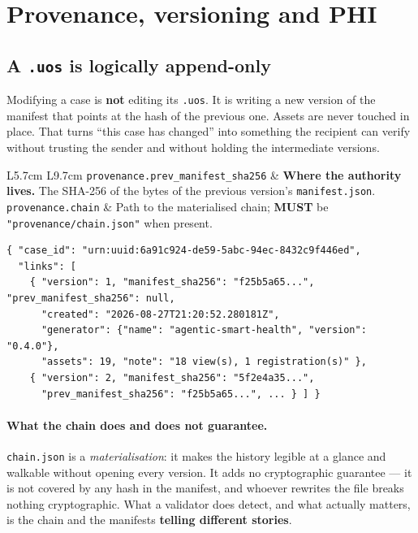 \documentclass[11pt,a4paper]{article}
\newcommand{\MUST}{\textcolor{uosred}{\textbf{MUST}}}
\newcommand{\code}[1]{\texttt{\small #1}}
\begin{document}
\section{Provenance, versioning and PHI}\label{sec:provenance}

\subsection{A \code{.uos} is logically append-only}

Modifying a case is \textbf{not} editing its \code{.uos}. It is writing a new version of
the manifest that points at the hash of the previous one. Assets are never touched in
place. That turns ``this case has changed'' into something the recipient can verify without
trusting the sender and without holding the intermediate versions.

\begin{longtable}{L{5.7cm} L{9.7cm}}
\toprule
\code{provenance.prev\_manifest\_sha256} & \textbf{Where the authority lives.} The SHA-256
of the bytes of the previous version's \code{manifest.json}.\\
\code{provenance.chain} & Path to the materialised chain; \MUST{} be
\code{"provenance/chain.json"} when present.\\
\bottomrule
\end{longtable}

\begin{lstlisting}[style=js]
{ "case_id": "urn:uuid:6a91c924-de59-5abc-94ec-8432c9f446ed",
  "links": [
    { "version": 1, "manifest_sha256": "f25b5a65...", "prev_manifest_sha256": null,
      "created": "2026-08-27T21:20:52.280181Z",
      "generator": {"name": "agentic-smart-health", "version": "0.4.0"},
      "assets": 19, "note": "18 view(s), 1 registration(s)" },
    { "version": 2, "manifest_sha256": "5f2e4a35...",
      "prev_manifest_sha256": "f25b5a65...", ... } ] }
\end{lstlisting}

\paragraph{What the chain does and does not guarantee.}
\code{chain.json} is a \emph{materialisation}: it makes the history legible at a glance and
walkable without opening every version. It adds no cryptographic guarantee --- it is not
covered by any hash in the manifest, and whoever rewrites the file breaks nothing
cryptographic. What a validator does detect, and what actually matters, is the chain and
the manifests \textbf{telling different stories}.
\end{document}

